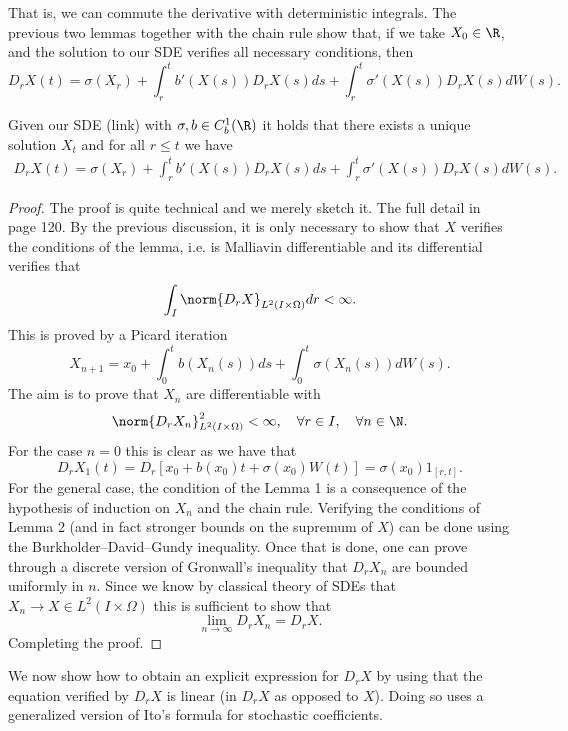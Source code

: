\documentclass[
    a4paper,
    DIV=14,
    abstract=true,
    numbers=noenddot
]{scrartcl}
\begin{document}
That is, we can commute the derivative with deterministic integrals. The previous two lemmas together with the chain rule show that, if we take $X_0\in \R$, and the solution to our SDE verifies all necessary conditions, then
\begin{equation*}
	D_rX(t)=\sigma(X_r)+\int_{r}^tb'(X(s))D_rX(s) ds+\int_{r}^t \sigma'(X(s))D_rX(s) dW(s) .
\end{equation*}
\begin{proposition}
	Given our SDE (link) with $\sigma ,b\in C^1_b(\R)$ it holds that there exists a unique solution $X_t$ and for all $r\leq t$ we have
	\begin{align*}
		D_rX(t)=\sigma(X_r)+\int_{r}^tb'(X(s))D_rX(s) ds+\int_{r}^t \sigma'(X(s))D_rX(s) dW(s) .
	\end{align*}
\end{proposition}
\begin{proof}
	The proof is quite technical and we merely sketch it. The full detail in \cite{nunno2008malliavin} page 120.    By the previous discussion, it is only necessary to show that $X$ verifies the conditions of the lemma, i.e. is Malliavin differentiable and its differential verifies that
	\begin{equation*}
		\int_{I}\norm{D_rX}_{L^2(I\times\Omega)} d r<\infty.
	\end{equation*}
	This is proved by a Picard iteration
	\begin{equation*}
		X_{n+1}=x_0+\int_{0}^t b(X_n(s)) ds+\int_{0}^t\sigma (X_n(s)) dW(s).
	\end{equation*}
	The aim is to prove that $X_n$ are differentiable with
	\begin{equation*}
		\norm{D_rX_n}_{L^2(I\times\Omega)}^2<\infty , \quad\forall r\in I, \quad\forall n\in \N.
	\end{equation*}
	For the case $n=0$ this is clear as we have that
	\begin{equation*}
		D_rX_1(t)=D_r[x_0+b(x_0)t+\sigma (x_0) W(t)]=\sigma(x_0)1_{[r,t]}.
	\end{equation*}
	For the general case, the condition of the Lemma 1 is a consequence of the hypothesis of induction on $X_n$ and the chain rule.  Verifying the conditions of Lemma 2 (and in fact stronger bounds on the supremum of $X$) can be done using the Burkholder–David–Gundy inequality. Once that is done, one can prove through a discrete version of Gronwall's inequality that $D_rX_n$ are bounded uniformly in  $n$. Since we know by classical theory of SDEs that $X_n\to X\in L^2(I\times\Omega)$ this is sufficient to show that	\begin{equation*}
		\lim_{n \to \infty}D_rX_n=D_rX.
	\end{equation*}
	Completing the proof.
\end{proof}
We now show how to obtain an explicit expression for $D_rX$ by using that the equation verified by  $D_rX$ is linear (in  $D_rX$ as opposed to $X$). Doing so uses a generalized version of Ito's formula for stochastic coefficients.
\end{document}

